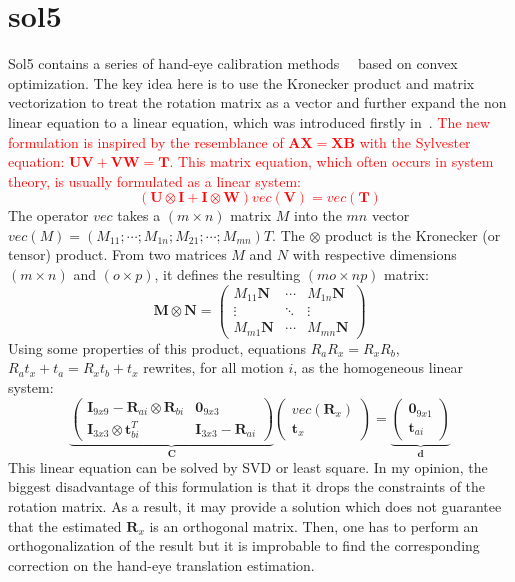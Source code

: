 \section{sol5}
Sol5 contains a series of hand-eye calibration methods~\cite{zhao2018simultaneous}~\cite{zhao2011hand} based on convex optimization. The key idea here is to use the Kronecker product and matrix vectorization to treat the rotation matrix as a vector and further expand the non linear equation to a linear equation, which was introduced firstly in~\cite{andreff1999line}.
\textcolor{red}{The new formulation is inspired by the resemblance of $\mathbf{AX}=\mathbf{XB}$ with the Sylvester equation: $\mathbf{UV} + \mathbf{VW} = \mathbf{T}$. This matrix equation, which often occurs in system theory, is usually formulated as a linear system:
$$
(\mathbf{U}\otimes\mathbf{I}+\mathbf{I}\otimes\mathbf{W})vec(\mathbf{V})=vec(\mathbf{T})
$$}
The operator $vec$ takes a $(m \times n)$ matrix $M$ into the $mn$ vector $vec(M) =
(M_{11};\cdots;M_{1n};M_{21}; \cdots ;M_{mn})T$. The $\otimes$ product is the Kronecker (or tensor) product. From two matrices $M$ and $N$ with respective
dimensions $(m \times n)$ and $(o \times p)$, it defines the resulting $(mo \times np)$ matrix:
$$
\mathbf{M}\otimes\mathbf{N}=\left(
\begin{matrix}
M_{11}\mathbf{N} & \cdots & M_{1n}\mathbf{N} \\
\vdots & \ddots & \vdots \\
M_{m1}\mathbf{N} & \cdots & M_{mn}\mathbf{N} 
\end{matrix}
\right)
$$
Using some properties of this product, equations $R_aR_x=R_xR_b$, $R_at_x+t_a=R_xt_b+t_x$ rewrites, for all motion $i$, as the homogeneous linear system:
$$
\underbrace{
\left(
\begin{matrix}
\mathbf{I}_{9x9}-\mathbf{R}_{ai}\otimes\mathbf{R}_{bi} & \mathbf{0}_{9x3} \\
\mathbf{I}_{3x3}\otimes\mathbf{t}_{bi}^T & \mathbf{I}_{3x3}-\mathbf{R}_{ai}
\end{matrix}
\right)}_{\mathbf{C}}
\left(
\begin{matrix}
vec(\mathbf{R}_x) \\
\mathbf{t}_x
\end{matrix}
\right)=\underbrace{
\left(
\begin{matrix}
\mathbf{0}_{9x1} \\
\mathbf{t}_{ai}
\end{matrix}
\right)}_{\mathbf{d}}
$$
This linear equation can be solved by SVD or least square. In my opinion, the biggest disadvantage of this formulation is that it drops the constraints of the rotation matrix. As a result, it may provide a solution which does not guarantee that the estimated $\mathbf{R}_x$ is an orthogonal matrix. Then, one has to perform an orthogonalization of the result but it is improbable to find the corresponding correction on the hand-eye translation estimation.

